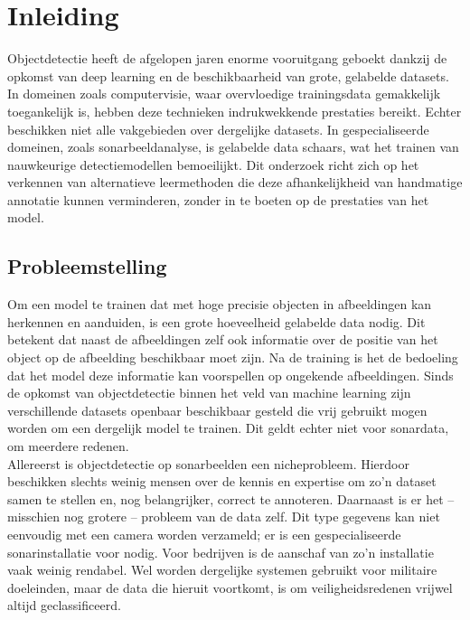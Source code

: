 
\chapter{Inleiding}%
\label{ch:inleiding}

Objectdetectie heeft de afgelopen jaren enorme vooruitgang geboekt dankzij de opkomst van deep learning en de beschikbaarheid van grote, gelabelde datasets. In domeinen zoals computervisie, waar overvloedige trainingsdata gemakkelijk toegankelijk is, hebben deze technieken indrukwekkende prestaties bereikt. Echter beschikken niet alle vakgebieden over dergelijke datasets. In gespecialiseerde domeinen, zoals sonarbeeldanalyse, is gelabelde data schaars, wat het trainen van nauwkeurige detectiemodellen bemoeilijkt. Dit onderzoek richt zich op het verkennen van alternatieve leermethoden die deze afhankelijkheid van handmatige annotatie kunnen verminderen, zonder in te boeten op de prestaties van het model.

\section{Probleemstelling}%
\label{sec:probleemstelling}

Om een model te trainen dat met hoge precisie objecten in afbeeldingen kan herkennen en aanduiden, is een grote hoeveelheid gelabelde data nodig. Dit betekent dat naast de afbeeldingen zelf ook informatie over de positie van het object op de afbeelding beschikbaar moet zijn. Na de training is het de bedoeling dat het model deze informatie kan voorspellen op ongekende afbeeldingen. Sinds de opkomst van objectdetectie binnen het veld van machine learning zijn verschillende datasets openbaar beschikbaar gesteld die vrij gebruikt mogen worden om een dergelijk model te trainen. Dit geldt echter niet voor sonardata, om meerdere redenen. \\

Allereerst is objectdetectie op sonarbeelden een nicheprobleem. Hierdoor beschikken slechts weinig mensen over de kennis en expertise om zo’n dataset samen te stellen en, nog belangrijker, correct te annoteren. Daarnaast is er het – misschien nog grotere – probleem van de data zelf. Dit type gegevens kan niet eenvoudig met een camera worden verzameld; er is een gespecialiseerde sonarinstallatie voor nodig. Voor bedrijven is de aanschaf van zo’n installatie vaak weinig rendabel. Wel worden dergelijke systemen gebruikt voor militaire doeleinden, maar de data die hieruit voortkomt, is om veiligheidsredenen vrijwel altijd geclassificeerd. \\

